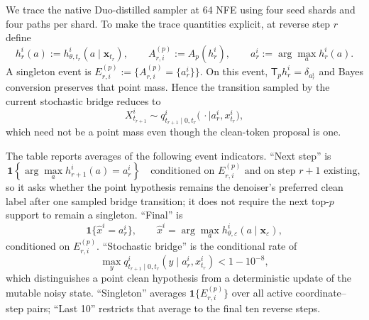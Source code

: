 \documentclass{article}
\newcommand{\1}{\mathbf 1}
\theoremstyle{definition}
\begin{document}
We trace the native Duo-distilled sampler at 64 NFE using four seed shards and
four paths per shard. To make the trace quantities explicit, at reverse step
$r$ define
\begin{equation}
 h_r^i(a):=h_{\theta,t_r}^i(a\mid\bm x_{t_r}),
 \qquad
 A_{r,i}^{(p)}:=A_p(h_r^i),
 \qquad
 a_r^i:=\arg\max_a h_r^i(a).
 \label{eq:singleton-trace-def-app}
\end{equation}
A singleton event is
$E_{r,i}^{(p)}:=\{A_{r,i}^{(p)}=\{a_r^i\}\}$. On this event,
$\mathsf T_ph_r^i=\delta_{a_r^i}$ and Bayes conversion preserves that point
mass. Hence the transition sampled by the current stochastic bridge reduces to
\begin{equation}
 X_{t_{r+1}}^i\sim
 q_{t_{r+1}\mid0,t_r}^i
 \bigl(\,\cdot\mid a_r^i,x_{t_r}^i\bigr),
 \label{eq:singleton-bridge-app}
\end{equation}
which need not be a point mass even though the clean-token proposal is one.

The table reports averages of the following event indicators. ``Next step''
is
\begin{equation}
 \1\!\left\{
 \arg\max_a h_{r+1}^i(a)=a_r^i
 \right\}
 \quad\text{conditioned on }E_{r,i}^{(p)}
 \text{ and on step }r+1\text{ existing},
 \label{eq:singleton-next-step-app}
\end{equation}
so it asks whether the point hypothesis remains the denoiser's preferred clean
label after one sampled bridge transition; it does not require the next top-$p$
support to remain a singleton. ``Final'' is
\begin{equation}
 \1\{\widehat x^i=a_r^i\},
 \qquad
 \widehat x^i=\arg\max_a
 h_{\theta,\varepsilon}^i(a\mid\bm x_\varepsilon),
 \label{eq:singleton-final-app}
\end{equation}
conditioned on $E_{r,i}^{(p)}$. ``Stochastic bridge'' is the conditional rate
of
\begin{equation}
 \max_y q_{t_{r+1}\mid0,t_r}^i
 (y\mid a_r^i,x_{t_r}^i)<1-10^{-8},
 \label{eq:singleton-stochastic-bridge-app}
\end{equation}
which distinguishes a point clean hypothesis from a deterministic update of
the mutable noisy state. ``Singleton'' averages $\1\{E_{r,i}^{(p)}\}$ over all
active coordinate--step pairs; ``Last 10'' restricts that average to the final
ten reverse steps.
\end{document}
